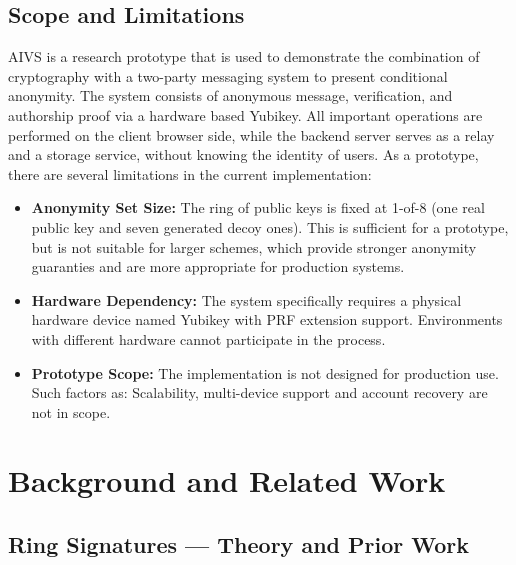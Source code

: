 \documentclass[letterpaper,11pt]{article}
\begin{document}
\subsection{Scope and Limitations}
AIVS is a research prototype that is used to demonstrate the combination of cryptography with a two-party messaging system to present conditional anonymity. The system consists of anonymous message, verification, and authorship proof via a hardware based Yubikey. All important operations are performed on the client browser side, while the backend server serves as a relay and a storage service, without knowing the identity of users.
As a prototype, there are several limitations in the current implementation:
\begin{itemize}
    \item \textbf{Anonymity Set Size:} The ring of public keys is fixed at 1-of-8 (one real public key and seven generated decoy ones). This is sufficient for a prototype, but is not suitable for larger schemes, which provide stronger anonymity guaranties and are more appropriate for production systems.
    \item \textbf{Hardware Dependency:} The system specifically requires a physical hardware device named Yubikey with PRF extension support. Environments with different hardware cannot participate in the process.
    \item \textbf{Prototype Scope:} The implementation is not designed for production use. Such factors as: Scalability, multi-device support and account recovery are not in scope.
\end{itemize}

\section{Background and Related Work}
\subsection{Ring Signatures --- Theory and Prior Work}
\end{document}
